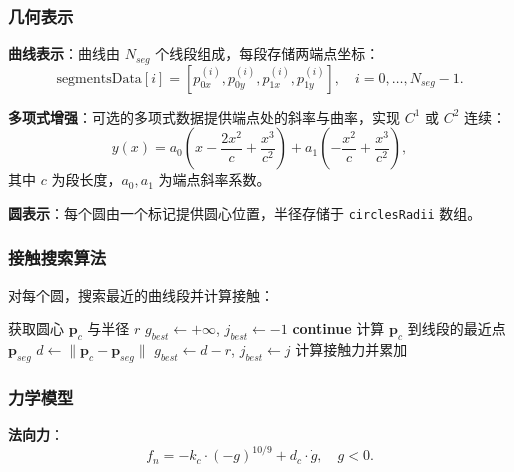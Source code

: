 \documentclass[12pt]{ctexart}
\begin{document}
\subsubsection{几何表示}

\textbf{曲线表示}：曲线由 $N_{seg}$ 个线段组成，每段存储两端点坐标：
\begin{equation}
\text{segmentsData}[i] = [p_{0x}^{(i)}, p_{0y}^{(i)}, p_{1x}^{(i)}, p_{1y}^{(i)}], \quad i = 0, \ldots, N_{seg}-1.
\end{equation}

\textbf{多项式增强}：可选的多项式数据提供端点处的斜率与曲率，实现 $C^1$ 或 $C^2$ 连续：
\begin{equation}
y(x) = a_0 \left(x - \frac{2x^2}{c} + \frac{x^3}{c^2}\right) + a_1 \left(-\frac{x^2}{c} + \frac{x^3}{c^2}\right),
\end{equation}
其中 $c$ 为段长度，$a_0, a_1$ 为端点斜率系数。

\textbf{圆表示}：每个圆由一个标记提供圆心位置，半径存储于 \verb|circlesRadii| 数组。

\subsubsection{接触搜索算法}

对每个圆，搜索最近的曲线段并计算接触：

\begin{algorithm}[htbp]
\caption{CurveCircles 接触搜索}
\begin{algorithmic}[1]
  \State 获取圆心 $\mathbf{p}_c$ 与半径 $r$
  \State $g_{best} \gets +\infty$, $j_{best} \gets -1$
      \State \textbf{continue}
    \EndIf
    \State 计算 $\mathbf{p}_c$ 到线段的最近点 $\mathbf{p}_{seg}$
    \State $d \gets \|\mathbf{p}_c - \mathbf{p}_{seg}\|$
      \State $g_{best} \gets d - r$, $j_{best} \gets j$
    \EndIf
  \EndFor
    \State 计算接触力并累加
  \EndIf
\EndFor
\end{algorithmic}
\end{algorithm}

\subsubsection{力学模型}

\textbf{法向力}：
\begin{equation}
f_n = -k_c \cdot (-g)^{10/9} + d_c \cdot \dot{g}, \quad g < 0.
\end{equation}
\end{document}
